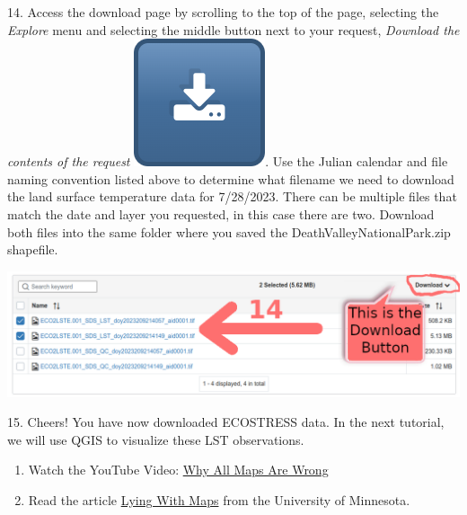 \documentclass[oneside,a4paper,11pt,explicit]{book}
\begin{document}
14. Access the download page by scrolling to the top of the page, selecting the \textit{Explore} menu and selecting the middle button next to your request, \textit{Download the contents of the request} \includegraphics[height=\fontcharht\font`\B]{DownloadButton.png}. Use the Julian calendar and file naming convention listed above to determine what filename we need to download the land surface temperature data for 7/28/2023. There can be multiple files that match the date and layer you requested, in this case there are two. Download both files into the same folder where you saved the DeathValleyNationalPark.zip shapefile.

\centerline{\includegraphics[width=\textwidth]{DownloadInstructions.png}}

15. Cheers! You have now downloaded ECOSTRESS data. In the next tutorial, we will use QGIS to visualize these LST observations.

\begin{tcolorbox}[colback=yellow!5!white,colframe=MACred,title= \vspace{.2em} \Large Map of the Week Assignments]
	\large
	\begin{enumerate}
		\item Watch the YouTube Video: \href{https://youtu.be/kIID5FDi2JQ}{Why All Maps Are Wrong}
		\item Read the article \href{https://open.lib.umn.edu/mapping/chapter/7-lying-with-maps/}{Lying With Maps} from the University of Minnesota. 
	\end{enumerate}
\end{tcolorbox}
\end{document}
